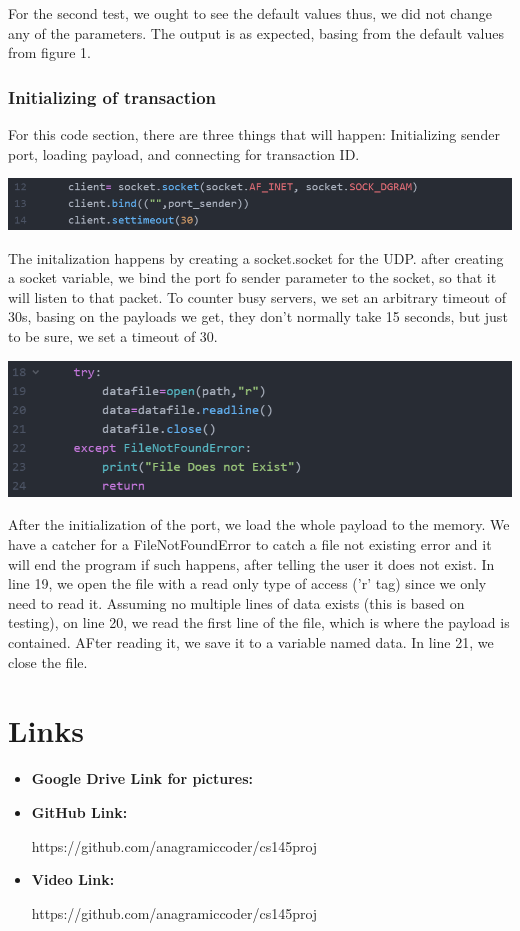 \documentclass[a4paper]{article} %
\begin{document}
    For the second test, we ought to see the default values thus, we did not change
    any of the parameters. The output is as expected, basing from the
    default values from figure 1.
    \subsubsection{Initializing of transaction}
    For this code section, there are three things that will happen: Initializing sender port, loading payload, and connecting
    for transaction ID.
    \begin{center}
        \includegraphics[width=\textwidth]{port init.png}
    \end{center}
    The initalization happens by creating a socket.socket for the UDP.
    after creating a socket variable, we bind the port fo sender parameter to the socket, 
    so that it will listen to that packet. To counter busy servers, we set an arbitrary timeout of 30s, 
    basing on the payloads we get, they don't normally take 15 seconds, but just to be sure, we set a timeout of 30.
    \vspace{3cm}
    \begin{center}
        \includegraphics[width=\textwidth]{loadingdata.png}
    \end{center}
    After the initialization of the port, we load the whole payload to the memory.
    We have a catcher for a FileNotFoundError to catch a file not existing error and 
    it will end the program if such happens, after telling the user it does not exist.
    In line 19, we open the file with a read only type of access ('r' tag) since we only need to read it.
    Assuming no multiple lines of data exists (this is based on testing), on line 20, we read the first line of the file, which
    is where the payload is contained. AFter reading it, we save it to a variable named data. In line 21, we 
    close the file.

\section{Links}
\begin{itemize}
    \item \hypertarget{glink}{\textbf{Google Drive Link for pictures:}} 
    \item \hypertarget{glink}{\textbf{GitHub Link:}} https://github.com/anagramiccoder/cs145proj
    \item \hypertarget{glink}{\textbf{Video Link:}} https://github.com/anagramiccoder/cs145proj
\end{itemize}
\end{document}
